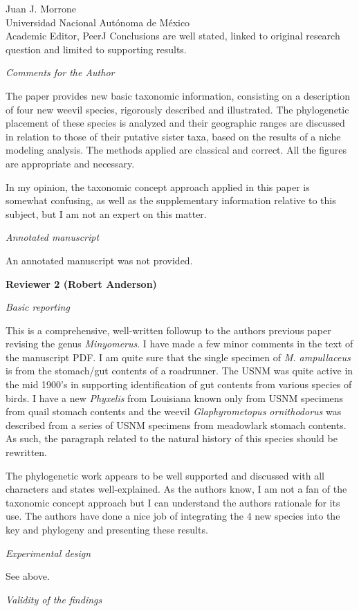 \documentclass[10pt,letterpaper]{letter}
\begin{document}
\begin{letter}{Juan J. Morrone\\Universidad Nacional Aut\'{o}noma de M\'{e}xico\\Academic Editor, PeerJ}
	Conclusions are well stated, linked to original research question and limited to supporting results.
	
	\emph{Comments for the Author}
	
	The paper provides new basic taxonomic information, consisting on a description of four new weevil species, rigorously described and illustrated.
	The phylogenetic placement of these species is analyzed and their geographic ranges are discussed in relation to those of their putative sister taxa, based on the results of a niche modeling analysis.
	The methods applied are classical and correct.
	All the figures are appropriate and necessary. 

	In my opinion, the taxonomic concept approach applied in this paper is somewhat confusing, as well as the supplementary information relative to this subject, but I am not an expert on this matter.
	
	\emph{Annotated manuscript}
	
	An annotated manuscript was not provided.
	
	\newpage	
	\textbf{Reviewer 2 (Robert Anderson)}
	
	\emph{Basic reporting}
	
	This is a comprehensive, well-written followup to the authors previous paper revising the genus \textit{Minyomerus}.
	I have made a few minor comments in the text of the manuscript PDF.
	I am quite sure that the single specimen of \textit{M. ampullaceus} is from the stomach/gut contents of a roadrunner.
	The USNM was quite active in the mid 1900's in supporting identification of gut contents from various species of birds.
	I have a new \textit{Phyxelis} from Louisiana known only from USNM specimens from quail stomach contents and the weevil \textit{Glaphyrometopus ornithodorus} was described from a series of USNM specimens from meadowlark stomach contents.
	As such, the paragraph related to the natural history of this species should be rewritten.

	The phylogenetic work appears to be well supported and discussed with all characters and states well-explained.
	As the authors know, I am not a fan of the taxonomic concept approach but I can understand the authors rationale for its use.
	The authors have done a nice job of integrating the 4 new species into the key and phylogeny and presenting these results.
	
	\emph{Experimental design}
	
	See above.
	
	\emph{Validity of the findings}
	

\end{letter}
\end{document}
